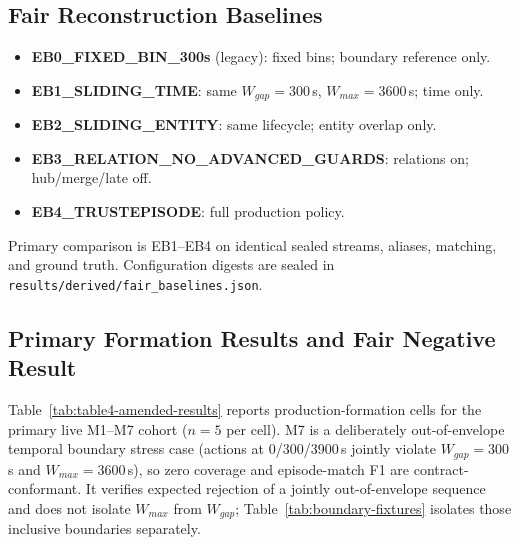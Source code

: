 \subsection{Fair Reconstruction Baselines}
\label{sec:baselines}

\begin{itemize}
  \item \textbf{EB0\_FIXED\_BIN\_300s} (legacy): fixed bins; boundary reference only.
  \item \textbf{EB1\_SLIDING\_TIME}: same $W_{gap}=300$\,s, $W_{max}=3600$\,s; time only.
  \item \textbf{EB2\_SLIDING\_ENTITY}: same lifecycle; entity overlap only.
  \item \textbf{EB3\_RELATION\_NO\_ADVANCED\_GUARDS}: relations on; hub/merge/late off.
  \item \textbf{EB4\_TRUSTEPISODE}: full production policy.
\end{itemize}
Primary comparison is EB1--EB4 on identical sealed streams, aliases, matching, and ground truth.
Configuration digests are sealed in \texttt{results/derived/fair\_baselines.json}.

\subsection{Primary Formation Results and Fair Negative Result}
\label{sec:formation-results}

Table~\ref{tab:table4-amended-results} reports production-formation cells for the primary live
M1--M7 cohort ($n=5$ per cell). M7 is a deliberately out-of-envelope temporal boundary stress case
(actions at 0/300/3900\,s jointly violate $W_{gap}=300$\,s and $W_{max}=3600$\,s), so zero coverage
and episode-match F1 are contract-conformant. It verifies expected rejection of a jointly
out-of-envelope sequence and does not isolate $W_{max}$ from $W_{gap}$;
Table~\ref{tab:boundary-fixtures} isolates those inclusive boundaries separately.

